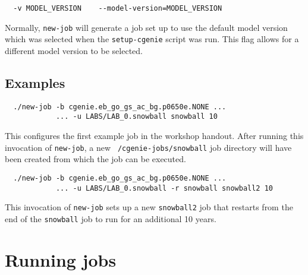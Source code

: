 \documentclass[a4paper,10pt,article]{memoir}
\begin{document}
\begin{verbatim}
  -v MODEL_VERSION    --model-version=MODEL_VERSION
\end{verbatim}
Normally, \texttt{new-job} will generate a job set up to use the
default model version which was selected when the
\texttt{setup-cgenie} script was run.  This flag allows for a
different model version to be selected.

\subsection*{Examples}

\begin{verbatim}
  ./new-job -b cgenie.eb_go_gs_ac_bg.p0650e.NONE ...
            ... -u LABS/LAB_0.snowball snowball 10
\end{verbatim}
This configures the first example job in the workshop handout.  After
running this invocation of \texttt{new-job}, a new
\texttt{~/cgenie-jobs/snowball} job directory will have been created
from which the job can be executed.

\begin{verbatim}
  ./new-job -b cgenie.eb_go_gs_ac_bg.p0650e.NONE ...
            ... -u LABS/LAB_0.snowball -r snowball snowball2 10
\end{verbatim}
This invocation of \texttt{new-job} sets up a new \texttt{snowball2}
job that restarts from the end of the \texttt{snowball} job to run for
an additional 10 years.

\section{Running jobs}
\end{document}
